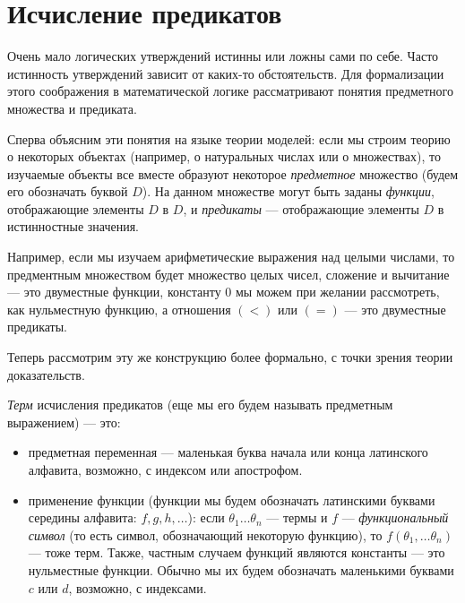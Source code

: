 \section{Исчисление предикатов}

Очень мало логических утверждений истинны или ложны сами по себе.
Часто истинность утверждений зависит от каких-то обстоятельств.
Для формализации этого соображения в математической логике рассматривают
понятия предметного множества и предиката.

Сперва объясним эти понятия на языке теории моделей:
если мы строим теорию о некоторых объектах (например, о натуральных 
числах или о множествах), то изучаемые объекты все вместе образуют 
некоторое \emph{предметное} множество (будем его обозначать буквой $D$). 
На данном множестве могут быть заданы \emph{функции}, отображающие элементы
$D$ в $D$, и \emph{предикаты} --- отображающие элементы $D$ в 
истинностные значения.

Например, если мы изучаем арифметические выражения над целыми числами, 
то предментным множеством будет множество целых чисел, сложение и 
вычитание --- это двуместные функции, константу $0$ мы можем при желании
рассмотреть, как нульместную функцию, а отношения $(<)$ или $(=)$ ---
это двуместные предикаты.

Теперь рассмотрим эту же конструкцию более формально, с точки зрения теории 
доказательств.

\begin{definition}\emph{Терм} исчисления предикатов (еще мы его будем
называть предметным выражением) --- это:
\begin{itemize}
\item предметная переменная --- маленькая буква начала или конца латинского 
алфавита, возможно, с индексом или апострофом.
\item применение функции (функции мы будем обозначать латинскими 
буквами середины алфавита: $f, g, h, \dots$):
если $\theta_1 \dots \theta_n$ --- термы и $f$ --- 
\emph{функциональный символ} (то есть символ, обозначающий некоторую
функцию), то $f (\theta_1, \dots \theta_n)$ 
--- тоже терм. Также, частным случаем функций являются константы ---
это нульместные функции. Обычно мы их будем обозначать маленькими 
буквами $c$ или $d$, возможно, с индексами.
\end{itemize}
\end{definition}

